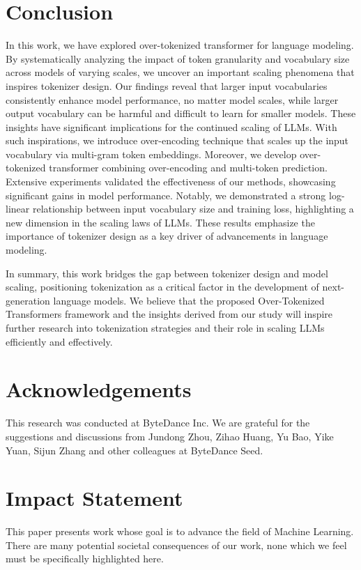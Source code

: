 
\section{Conclusion}
In this work, we have explored over-tokenized transformer for language modeling. By systematically analyzing the impact of token granularity and vocabulary size across models of varying scales, we uncover an important scaling phenomena that inspires tokenizer design. Our findings reveal that larger input vocabularies consistently enhance model performance, no matter model scales, while larger output vocabulary can be harmful and difficult to learn for smaller models. These insights have significant implications for the continued scaling of LLMs. With such inspirations, we introduce over-encoding technique that scales up the input vocabulary via multi-gram token embeddings. Moreover, we develop over-tokenized transformer combining over-encoding and multi-token prediction. Extensive experiments validated the effectiveness of our methods, showcasing significant gains in model performance. Notably, we demonstrated a strong log-linear relationship between input vocabulary size and training loss, highlighting a new dimension in the scaling laws of LLMs. These results emphasize the importance of tokenizer design as a key driver of advancements in language modeling.

In summary, this work bridges the gap between tokenizer design and model scaling, positioning tokenization as a critical factor in the development of next-generation language models. We believe that the proposed Over-Tokenized Transformers framework and the insights derived from our study will inspire further research into tokenization strategies and their role in scaling LLMs efficiently and effectively.


\section*{Acknowledgements}

This research was conducted at ByteDance Inc. We are grateful for the suggestions and discussions from Jundong Zhou, Zihao Huang, Yu Bao, Yike Yuan, Sijun Zhang and other colleagues at ByteDance Seed.

\section*{Impact Statement}

This paper presents work whose goal is to advance the field of 
Machine Learning. There are many potential societal consequences 
of our work, none which we feel must be specifically highlighted here.

